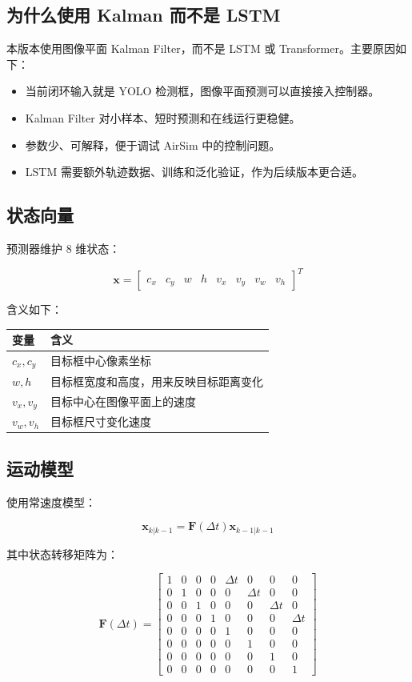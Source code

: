 \documentclass[UTF8,a4paper,11pt]{ctexart}
\begin{document}
\subsection{为什么使用 Kalman 而不是 LSTM}

本版本使用图像平面 Kalman Filter，而不是 LSTM 或 Transformer。主要原因如下：

\begin{itemize}
  \item 当前闭环输入就是 YOLO 检测框，图像平面预测可以直接接入控制器。
  \item Kalman Filter 对小样本、短时预测和在线运行更稳健。
  \item 参数少、可解释，便于调试 AirSim 中的控制问题。
  \item LSTM 需要额外轨迹数据、训练和泛化验证，作为后续版本更合适。
\end{itemize}

\subsection{状态向量}

预测器维护 8 维状态：

\[
\mathbf{x}=
\begin{bmatrix}
c_x & c_y & w & h & v_x & v_y & v_w & v_h
\end{bmatrix}^T
\]

含义如下：

\begin{longtable}{>{\raggedright\arraybackslash}p{3cm}p{10cm}}
\toprule
变量 & 含义 \\
\midrule
$c_x,c_y$ & 目标框中心像素坐标 \\
$w,h$ & 目标框宽度和高度，用来反映目标距离变化 \\
$v_x,v_y$ & 目标中心在图像平面上的速度 \\
$v_w,v_h$ & 目标框尺寸变化速度 \\
\bottomrule
\end{longtable}

\subsection{运动模型}

使用常速度模型：

\[
\mathbf{x}_{k|k-1} = \mathbf{F}(\Delta t)\mathbf{x}_{k-1|k-1}
\]

其中状态转移矩阵为：

\[
\mathbf{F}(\Delta t)=
\begin{bmatrix}
1&0&0&0&\Delta t&0&0&0\\
0&1&0&0&0&\Delta t&0&0\\
0&0&1&0&0&0&\Delta t&0\\
0&0&0&1&0&0&0&\Delta t\\
0&0&0&0&1&0&0&0\\
0&0&0&0&0&1&0&0\\
0&0&0&0&0&0&1&0\\
0&0&0&0&0&0&0&1
\end{bmatrix}
\]
\end{document}
